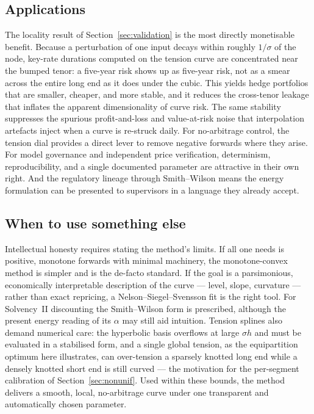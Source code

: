 \documentclass[10pt]{article}
\begin{document}
\subsection{Applications}
The locality result of Section~\ref{sec:validation} is the most directly monetisable benefit.
Because a perturbation of one input decays within roughly $1/\sigma$ of the node, key-rate
durations computed on the tension curve are concentrated near the bumped tenor: a five-year
risk shows up as five-year risk, not as a smear across the entire long end as it does under the
cubic. This yields hedge portfolios that are smaller, cheaper, and more stable, and it reduces
the cross-tenor leakage that inflates the apparent dimensionality of curve risk. The same
stability suppresses the spurious profit-and-loss and value-at-risk noise that interpolation
artefacts inject when a curve is re-struck daily. For no-arbitrage control, the tension dial
provides a direct lever to remove negative forwards where they arise. For model governance and
independent price verification, determinism, reproducibility, and a single documented parameter
are attractive in their own right. And the regulatory lineage through Smith--Wilson means the
energy formulation can be presented to supervisors in a language they already accept.

\subsection{When to use something else}
Intellectual honesty requires stating the method's limits. If all one needs is positive,
monotone forwards with minimal machinery, the monotone-convex method is simpler and is the
de-facto standard. If the goal is a parsimonious, economically interpretable description of the
curve --- level, slope, curvature --- rather than exact repricing, a Nelson--Siegel--Svensson
fit is the right tool. For Solvency~II discounting the Smith--Wilson form is prescribed,
although the present energy reading of its $\alpha$ may still aid intuition. Tension splines
also demand numerical care: the hyperbolic basis overflows at large $\sigma h$ and must be
evaluated in a stabilised form, and a single global tension, as the equipartition optimum here
illustrates, can over-tension a sparsely knotted long end while a densely knotted short end is
still curved --- the motivation for the per-segment calibration of Section~\ref{sec:nonunif}. Used within these
bounds, the method delivers a smooth, local, no-arbitrage curve under one transparent and
automatically chosen parameter.
\end{document}
